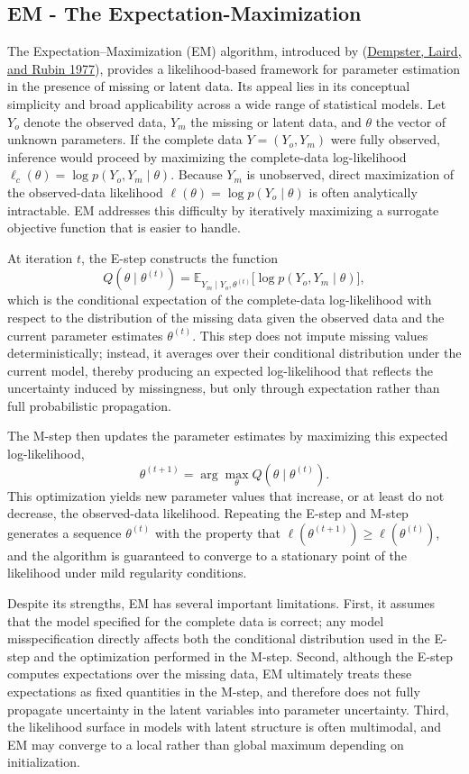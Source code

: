 \documentclass[
  12pt,
]{article}
\begin{document}
\subsection{EM - The Expectation-Maximization}

The Expectation--Maximization (EM) algorithm, introduced by
(\protect\hyperlink{ref-dempster1977maximum}{Dempster, Laird, and Rubin
1977}), provides a likelihood-based framework for parameter estimation
in the presence of missing or latent data. Its appeal lies in its
conceptual simplicity and broad applicability across a wide range of
statistical models. Let \(Y_o\) denote the observed data, \(Y_m\) the
missing or latent data, and \(\theta\) the vector of unknown parameters.
If the complete data \(Y = (Y_o, Y_m)\) were fully observed, inference
would proceed by maximizing the complete-data log-likelihood
\(\ell_c(\theta) = \log p(Y_o, Y_m \mid \theta)\). Because \(Y_m\) is
unobserved, direct maximization of the observed-data likelihood
\(\ell(\theta) = \log p(Y_o \mid \theta)\) is often analytically
intractable. EM addresses this difficulty by iteratively maximizing a
surrogate objective function that is easier to handle.

At iteration \(t\), the E-step constructs the function \[
Q(\theta \mid \theta^{(t)})
= \mathbb{E}_{Y_m \mid Y_o, \theta^{(t)}}
\big[ \log p(Y_o, Y_m \mid \theta) \big],
\] which is the conditional expectation of the complete-data
log-likelihood with respect to the distribution of the missing data
given the observed data and the current parameter estimates
\(\theta^{(t)}\). This step does not impute missing values
deterministically; instead, it averages over their conditional
distribution under the current model, thereby producing an expected
log-likelihood that reflects the uncertainty induced by missingness, but
only through expectation rather than full probabilistic propagation.

The M-step then updates the parameter estimates by maximizing this
expected log-likelihood, \[
\theta^{(t+1)} = \arg\max_{\theta} Q(\theta \mid \theta^{(t)}).
\] This optimization yields new parameter values that increase, or at
least do not decrease, the observed-data likelihood. Repeating the
E-step and M-step generates a sequence \({\theta^{(t)}}\) with the
property that \(\ell(\theta^{(t+1)}) \ge \ell(\theta^{(t)})\), and the
algorithm is guaranteed to converge to a stationary point of the
likelihood under mild regularity conditions.

Despite its strengths, EM has several important limitations. First, it
assumes that the model specified for the complete data is correct; any
model misspecification directly affects both the conditional
distribution used in the E-step and the optimization performed in the
M-step. Second, although the E-step computes expectations over the
missing data, EM ultimately treats these expectations as fixed
quantities in the M-step, and therefore does not fully propagate
uncertainty in the latent variables into parameter uncertainty. Third,
the likelihood surface in models with latent structure is often
multimodal, and EM may converge to a local rather than global maximum
depending on initialization.
\end{document}
